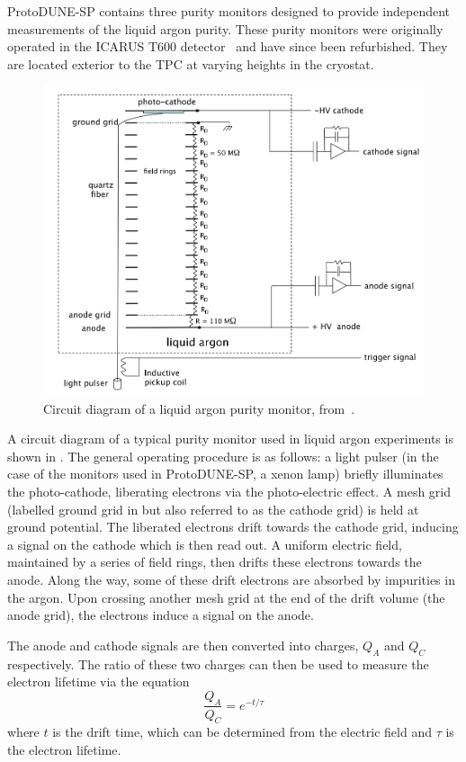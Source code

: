 ProtoDUNE-SP contains three purity monitors designed to provide independent measurements of the liquid argon purity.
These purity monitors were originally operated in the ICARUS T600 detector~\cite{icarus} and have since been refurbished.
They are located exterior to the TPC at varying heights in the cryostat.

\begin{figure}[h]
	\centering
	\includegraphics[width=.6\linewidth]{files/figures/protodune_detector/prmDiag}
	\caption[Circuit diagram of a typical purity monitor used in a liquid argon experiment]{Circuit diagram of a liquid argon purity monitor, from~\cite{Adamowski_2014}.}
	\label{fig:prmDiag}
\end{figure} 

A circuit diagram of a typical purity monitor used in liquid argon experiments is shown in .
The general operating procedure is as follows: a light pulser (in the case of the monitors used in ProtoDUNE-SP, a xenon lamp) briefly illuminates the photo-cathode, liberating electrons via the photo-electric effect.
A mesh grid (labelled ground grid in  but also referred to as the cathode grid) is held at ground potential.
The liberated electrons drift towards the cathode grid, inducing a signal on the cathode which is then read out.
A uniform electric field, maintained by a series of field rings, then drifts these electrons towards the anode.
Along the way, some of these drift electrons are absorbed by impurities in the argon.
Upon crossing another mesh grid at the end of the drift volume (the anode grid), the electrons induce a signal on the anode.

The anode and cathode signals are then converted into charges, $Q_{A}$ and $Q_{C}$ respectively.
The ratio of these two charges can then be used to measure the electron lifetime via the equation
\begin{equation}
\frac{Q_{A}}{Q_{C}} = e^{-t/\tau}
\end{equation}
where $t$ is the drift time, which can be determined from the electric field and $\tau$ is the electron lifetime.

